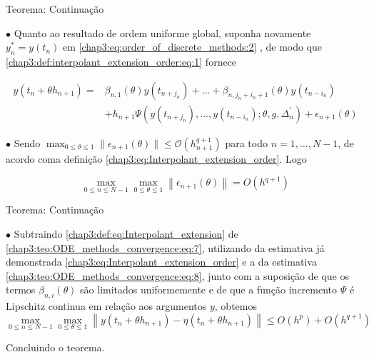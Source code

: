 \documentclass{beamer}
\theoremstyle{plain}
\theoremstyle{definition}
\begin{document}

\begin{frame}{Teorema: Continuação}

    \phantom{aa} $\bullet$ Quanto ao resultado de ordem uniforme global, suponha novamente \(y_{n}^{*}=y\left(t_{n}\right)\) em \eqref{chap3:eq:order_of_discrete_methods:2} , de modo que \eqref{chap3:def:interpolant_extension_order:eq:1} fornece 

    \begin{equation}
      \begin{aligned}
        y(t_{n}+\theta h_{n+1})= & \beta_{n, 1}(\theta) y(t_{n+j_{n}})+\ldots+\beta_{n, j_{n}+i_{n}+1}(\theta) y(t_{n-i_{n}}) \\
        & +h_{n+1} \Psi(y(t_{n+j_{n}}), \ldots, y(t_{n-i_{n}}) ; \theta, g, \Delta_{n}^{\prime})+\epsilon_{n+1}(\theta) 
      \end{aligned}
      \label{chap3:teo:ODE_methods_convergence:eq:7}
    \end{equation}

    \noindent
    \phantom{aa} $\bullet$ Sendo $\max _{0 \leq \theta \leq 1}\|\epsilon_{n+1}(\theta)\| \leq \mathcal{O}(h_{n+1}^{q+1})$ para todo $n = 1, \dots, N-1$, de acordo coma definição \eqref{chap3:eq:Interpolant_extension_order}. Logo

    \begin{equation}
      \max _{0 \leq n \leq N-1} \max _{0 \leq \theta \leq 1}\left\|\epsilon_{n+1}(\theta)\right\|=O\left(h^{q+1}\right)
      \label{chap3:teo:ODE_methods_convergence:eq:8}
    \end{equation}


\end{frame}




\begin{frame}{Teorema: Continuação}

    \phantom{aa} $\bullet$  Subtraindo \eqref{chap3:def:eq:Interpolant_extension} de \eqref{chap3:teo:ODE_methods_convergence:eq:7}, utilizando da estimativa já demonstrada \eqref{chap3:eq:Interpolant_extension_order} e a da estimativa \eqref{chap3:teo:ODE_methods_convergence:eq:8}, junto com a suposição de que os termos \(\beta_{n, i}(\theta)\) são limitados uniformemente e de que a função incremento \(\Psi\) é Lipschitz continua em relação aos argumentos \(y\), obtemos
    \[
      \max _{0 \leq n \leq N-1} \max _{0 \leq \theta \leq 1}\left\|y\left(t_{n}+\theta h_{n+1}\right)-\eta\left(t_{n}+\theta h_{n+1}\right)\right\| \leq O\left(h^{p}\right)+O\left(h^{q+1}\right)
    \]

    \noindent 
     Concluindo o teorema.
\end{frame}
\end{document}
